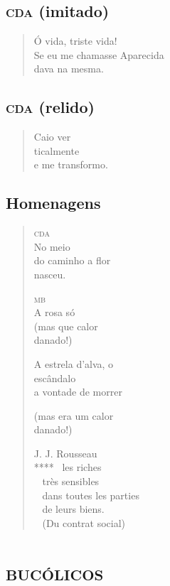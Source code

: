 \chapter{\textsc{cda} (imitado)}

\begin{verse}
Ó vida, triste vida!\\
Se eu me chamasse Aparecida\\
dava na mesma.
\end{verse}

\chapter{\textsc{cda} (relido)}

\begin{verse}
Caio ver\\
\qquad ticalmente\\
\qquad e me transformo.
\end{verse}

\chapter{Homenagens}

\begin{verse}
\textsc{cda}\\
No meio\\
do caminho a flor\\
nasceu.

\textsc{mb}\\
A rosa só\\
(mas que calor\\
danado!)

A estrela d'alva, o\\
escândalo\\
a vontade de morrer

(mas era um calor\\
danado!)

J. J. Rousseau\\
****\mbox{ } les riches\\
\quad\mbox{ } très sensibles\\
\quad\mbox{ } dans toutes les parties\\
\quad\mbox{ } de leurs biens.\\
\quad\mbox{ } (Du contrat social)
\end{verse}

\part*{\textsc{bucólicos}}

